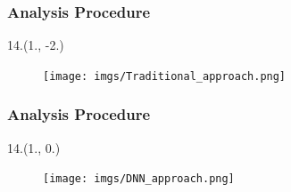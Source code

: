 \documentclass[12pt, xcolor={dvipsnames}, aspectratio = 169, sans,mathserif]{beamer}
\newenvironment{List}[2]
{\begin{textblock}{#1}#2
\begin{itemize}}
{\end{itemize}
\end{textblock}}
\newenvironment{Pic}[2]
{\begin{textblock}{#1}#2
\begin{figure}}
{\end{figure}
\end{textblock}}
\newcommand{\BeamerCite}[1]{{\tiny \footfullcite{#1}}}
\begin{document}
%
%
%
%
%
%
%
%
%
%

\begin{frame}
\frametitle{Analysis Procedure}
\begin{Pic}{14.}{(1., -2.)}
\texttt{[image: imgs/Traditional\_approach.png]}
\end{Pic}
\end{frame}

\begin{frame}
\frametitle{Analysis Procedure}
\begin{Pic}{14.}{(1., 0.)}
\texttt{[image: imgs/DNN\_approach.png]}
\end{Pic}
\end{frame}
\end{document}

